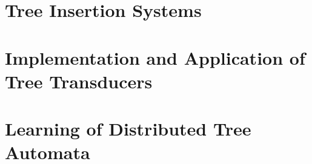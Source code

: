 \section{Tree Insertion Systems}
	
\section{Implementation and Application of Tree Transducers}
	
	
\section{Learning of Distributed Tree Automata}
	
